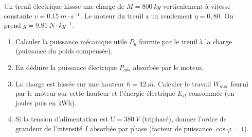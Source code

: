 \documentclass[11pt]{article}
\begin{document}
\begin{exercice}
Un treuil électrique hissse une charge de $M = \SI{800}{kg}$ verticalement à vitesse constante $v = \SI{0,15}{m\cdot s^{-1}}$. Le moteur du treuil a un rendement $\eta = 0,80$. On prend $g = \SI{9,81}{N\cdot kg^{-1}}$.
\begin{enumerate}
    \item Calculer la puissance mécanique utile $P_u$ fournie par le treuil à la charge (puissance du poids compensée).
    \item En déduire la puissance électrique $P_{abs}$ absorbée par le moteur.
    \item La charge est hissée sur une hauteur $h = \SI{12}{m}$. Calculer le travail $W_{mot}$ fourni par le moteur sur cette hauteur et l'énergie électrique $E_{el}$ consommée (en joules puis en kWh).
    \item Si la tension d'alimentation est $U = \SI{380}{V}$ (triphasé), donner l'ordre de grandeur de l'intensité $I$ absorbée par phase (facteur de puissance $\cos\varphi = 1$).
\end{enumerate}
\end{exercice}
\end{document}
